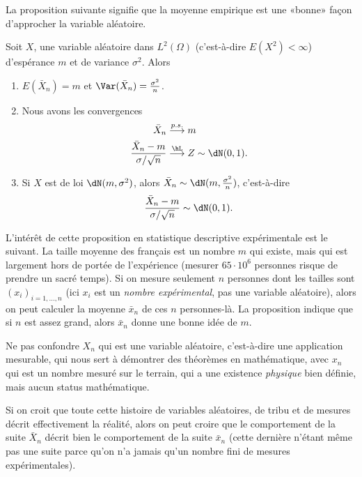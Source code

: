 La proposition suivante signifie que la moyenne empirique est une «bonne» façon d'approcher la variable aléatoire.
\begin{proposition}
    Soit \( X\), une variable aléatoire dans \( L^2(\Omega)\) (c'est-à-dire \( E(X^2)<\infty\)) d'espérance \( m\) et de variance \( \sigma^2\). Alors
    \begin{enumerate}
        \item
            \( E(\bar X_n)=m\) et \( \Var(\bar X_n)=\frac{ \sigma^2 }{ n }\).
        \item
            Nous avons les convergences
            \begin{subequations}
                \begin{align}
                    \bar X_n&\stackrel{p.s.}{\longrightarrow} m\\
                    \frac{ \bar X_n-m }{ \sigma/\sqrt{n} }&\stackrel{\hL}{\longrightarrow} Z\sim\dN(0,1).
                \end{align}
            \end{subequations}
        \item
            Si \( X\) est de loi \( \dN(m,\sigma^2)\), alors \( \bar X_n\sim\dN(m,\frac{ \sigma^2 }{ n })\), c'est-à-dire
            \begin{equation}
                \frac{ \bar X_n -m}{ \sigma/\sqrt{n} }\sim\dN(0,1).
            \end{equation}


    \end{enumerate}

\end{proposition}

\begin{remark}
    L'intérêt de cette proposition en statistique descriptive expérimentale est le suivant. La taille moyenne des français est un nombre \( m\) qui existe, mais qui est largement hors de portée de l'expérience (mesurer \( 65\cdot 10^6\) personnes risque de prendre un sacré temps). Si on mesure seulement \( n\) personnes dont les tailles sont \( (x_i)_{i=1,\ldots, n}\) (ici \( x_i\) est un \emph{nombre expérimental}, pas une variable aléatoire), alors on peut calculer la moyenne \( \bar x_n\) de ces \( n\) personnes-là. La proposition indique que si \( n\) est assez grand, alors \( \bar x_n\) donne une bonne idée de \( m\).

    Ne pas confondre \( X_n\) qui est une variable aléatoire, c'est-à-dire une application mesurable, qui nous sert à démontrer des théorèmes en mathématique, avec \( x_n\) qui est un nombre mesuré sur le terrain, qui a une existence \emph{physique} bien définie, mais aucun status mathématique.

    Si on croit que toute cette histoire de variables aléatoires, de tribu et de mesures décrit effectivement la réalité, alors on peut croire que le comportement de la suite \( \bar X_n\) décrit bien le comportement de la suite \( \bar x_n\) (cette dernière n'étant même pas une suite parce qu'on n'a jamais qu'un nombre fini de mesures expérimentales).
\end{remark}


